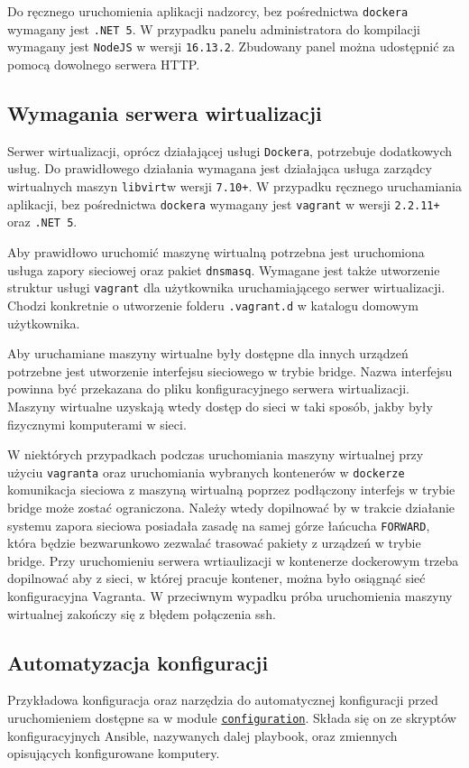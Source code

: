 \documentclass[../opis-rozwiazania.tex]{subfiles}
\begin{document}
Do ręcznego uruchomienia aplikacji nadzorcy, bez pośrednictwa \texttt{dockera} wymagany jest \texttt{.NET 5}. W przypadku panelu administratora do kompilacji wymagany jest \texttt{NodeJS} w wersji \texttt{16.13.2}. Zbudowany panel można udostępnić za pomocą dowolnego serwera HTTP.

\subsection{Wymagania serwera wirtualizacji}
\label{system_requirements.virtsrv_rquirements}
Serwer wirtualizacji, oprócz działającej usługi \texttt{Dockera}, potrzebuje dodatkowych usług.
Do prawidłowego działania wymagana jest działająca usługa zarządcy wirtualnych maszyn \texttt{libvirt}w wersji \texttt{7.10+}. W przypadku ręcznego uruchamiania aplikacji, bez pośrednictwa \texttt{dockera} wymagany jest \texttt{vagrant} w wersji \texttt{2.2.11+} oraz \texttt{.NET 5}.

Aby prawidłowo uruchomić maszynę wirtualną potrzebna jest uruchomiona usługa zapory sieciowej oraz pakiet \texttt{dnsmasq}.
Wymagane jest także utworzenie struktur usługi \texttt{vagrant} dla użytkownika uruchamiającego serwer wirtualizacji.
Chodzi konkretnie o utworzenie folderu \texttt{.vagrant.d} w katalogu domowym użytkownika.

Aby uruchamiane maszyny wirtualne były dostępne dla innych urządzeń potrzebne jest utworzenie interfejsu sieciowego w trybie bridge.
Nazwa interfejsu powinna być przekazana do pliku konfiguracyjnego serwera wirtualizacji.
Maszyny wirtualne uzyskają wtedy dostęp do sieci w taki sposób, jakby były fizycznymi komputerami w sieci.

W niektórych przypadkach podczas uruchomiania maszyny wirtualnej przy użyciu \texttt{vagranta} oraz uruchomiania wybranych kontenerów w \texttt{dockerze} komunikacja sieciowa z maszyną wirtualną poprzez podłączony interfejs w trybie bridge może zostać ograniczona.
Należy wtedy dopilnować by w trakcie działanie systemu zapora sieciowa posiadała zasadę na samej górze łańcucha \texttt{FORWARD}, która będzie bezwarunkowo zezwalać trasować pakiety z urządzeń w trybie bridge.
Przy uruchomieniu serwera wrtiaulizacji w kontenerze dockerowym trzeba dopilnować aby z sieci, w której pracuje kontener, można było osiągnąć sieć konfiguracyjna Vagranta.
W przeciwnym wypadku próba uruchomienia maszyny wirtualnej zakończy się z błędem połączenia ssh.

\subsection{Automatyzacja konfiguracji}
\label{system_requirements.ansible_conf}
Przykładowa konfiguracja oraz narzędzia do automatycznej konfiguracji przed uruchomieniem dostępne sa w module \href{https://github.com/one-click-desktop/configuration}{\texttt{configuration}}.
Składa się on ze skryptów konfiguracyjnych Ansible, nazywanych dalej playbook, oraz zmiennych opisujących konfigurowane komputery.
\end{document}
